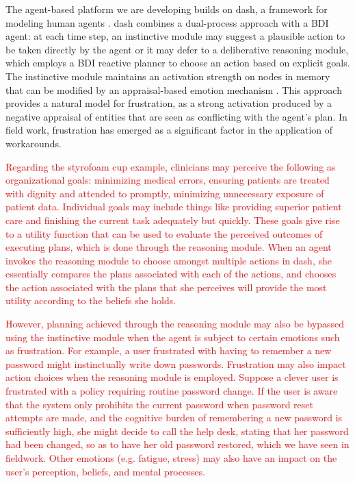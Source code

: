 \documentclass{acm_proc_article-sp}
\newcommand{\ignore}[1] {}
\begin{document}
\ignore{\textcolor{red}{relating to timeouts, in circumvention of security: good users do bad things, the space bar pressing example could be incorporated in an agent model.}}

The agent-based platform we are developing builds on {\sc dash}, a
framework for modeling human agents \cite{blythe2012dual}. {\sc dash}
combines a dual-process approach with a BDI agent: at each time step,
an instinctive module may suggest a plausible action to be taken
directly by the agent or it may defer to a deliberative reasoning
module, which employs a BDI reactive planner to choose an action based
on explicit goals. The instinctive module maintains an activation
strength on nodes in memory that can be modified by an appraisal-based
emotion mechanism \cite{spraragen12}. This approach provides a natural
model for frustration, as a strong activation produced by a negative
appraisal of entities that are seen as conflicting with the agent's
plan. In field work, frustration has emerged as a significant factor
in the application of workarounds.

\textcolor{red}{Regarding the styrofoam cup example, clinicians may perceive the 
following as organizational goals: minimizing medical errors, ensuring patients 
are treated with dignity and attended to promptly, minimizing unnecessary 
exposure of patient data. Individual goals may include things like providing 
superior patient care and finishing the current task adequately but quickly. 
These goals give rise to a utility function that can be used to evaluate the 
perceived outcomes of executing plans, which is done through 
the reasoning module. When an agent invokes the reasoning module to 
choose amongst multiple actions in {\sc dash}, she essentially compares the 
plans associated with each of the actions, and chooses the action associated
with the plans that she perceives will provide the most utility according to the 
beliefs she holds.}
 
\textcolor{red}{However, planning achieved through the reasoning module
may also be bypassed using the instinctive module when the agent is subject to certain 
emotions such as frustration. For example, a user frustrated with having to 
remember a new password might instinctually write down passwords.
Frustration may also impact action choices when the reasoning 
module is employed. Suppose a clever user is frustrated with a policy requiring
routine password change. If the user is aware that the system only prohibits 
the current password when password reset attempts are made, and the 
cognitive burden of remembering a new password is sufficiently high, 
she might decide to call the help desk, stating that her password had been 
changed, so as to have her old password restored, which we have seen in fieldwork. 
Other emotions (e.g. fatigue, stress) may also have an impact on the user's 
perception, beliefs, and mental processes.}
 
\end{document}
